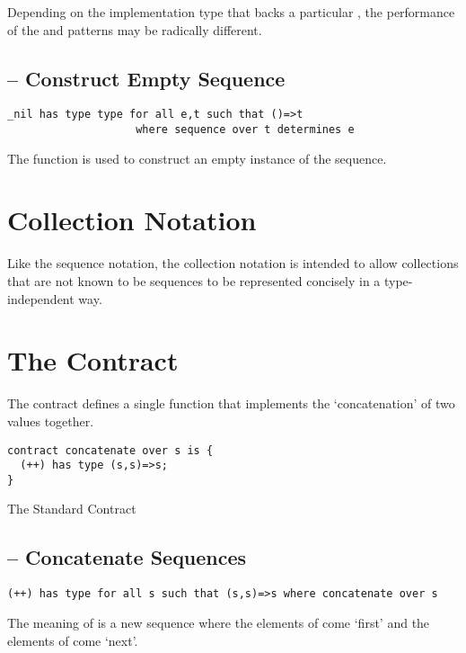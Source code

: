 \begin{aside}
Depending on the implementation type that backs a particular , the performance of the  and  patterns may be radically different.
\end{aside}

\subsection{ -- Construct Empty Sequence}
\label{newFunction}
\begin{lstlisting}
_nil has type type for all e,t such that ()=>t
                    where sequence over t determines e
\end{lstlisting}
The  function is used to construct an empty instance of the sequence.

\section{Collection Notation}
Like the sequence notation, the collection notation is intended to allow collections that are not known to be sequences to be represented concisely in a type-independent way.

\section{The  Contract}
\label{concatenateContract}
The  contract defines a single function that implements the `concatenation' of two values together.

\begin{program}[H]
\begin{lstlisting}
contract concatenate over s is {
  (++) has type (s,s)=>s;
}
\end{lstlisting}
\caption{The Standard  Contract}\label{concatenateContractDef}
\end{program}
\noindent

\subsection{\q{++} -- Concatenate Sequences}
\label{concatFunction}
\begin{lstlisting}
(++) has type for all s such that (s,s)=>s where concatenate over s
\end{lstlisting}
The meaning of  is a new sequence where the elements of  come `first' and the elements of  come `next'.

